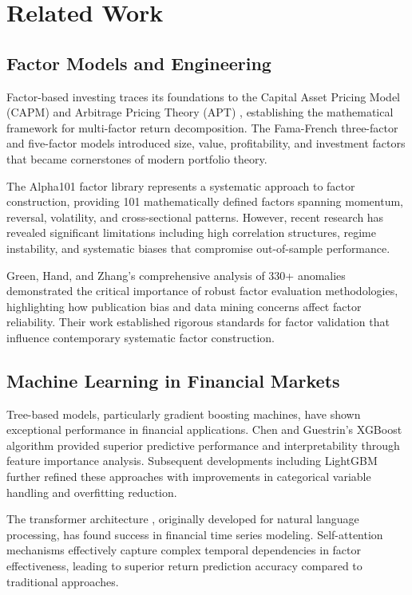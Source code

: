 \documentclass[conference]{IEEEtran}
\begin{document}
\section{Related Work}

\subsection{Factor Models and Engineering}

Factor-based investing traces its foundations to the Capital Asset Pricing Model (CAPM) \cite{b1} and Arbitrage Pricing Theory (APT) \cite{b2}, establishing the mathematical framework for multi-factor return decomposition. The Fama-French three-factor and five-factor models introduced size, value, profitability, and investment factors that became cornerstones of modern portfolio theory.

The Alpha101 factor library represents a systematic approach to factor construction, providing 101 mathematically defined factors spanning momentum, reversal, volatility, and cross-sectional patterns. However, recent research has revealed significant limitations including high correlation structures, regime instability, and systematic biases that compromise out-of-sample performance.

Green, Hand, and Zhang's comprehensive analysis of 330+ anomalies demonstrated the critical importance of robust factor evaluation methodologies, highlighting how publication bias and data mining concerns affect factor reliability. Their work established rigorous standards for factor validation that influence contemporary systematic factor construction.

\subsection{Machine Learning in Financial Markets}

Tree-based models, particularly gradient boosting machines, have shown exceptional performance in financial applications. Chen and Guestrin's XGBoost algorithm \cite{b3} provided superior predictive performance and interpretability through feature importance analysis. Subsequent developments including LightGBM \cite{b4} further refined these approaches with improvements in categorical variable handling and overfitting reduction.

The transformer architecture \cite{b5}, originally developed for natural language processing, has found success in financial time series modeling. Self-attention mechanisms effectively capture complex temporal dependencies in factor effectiveness, leading to superior return prediction accuracy compared to traditional approaches.
\end{document}
